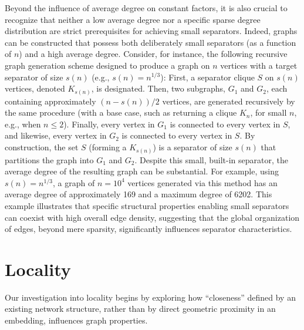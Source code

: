 Beyond the influence of average degree on constant factors, it is also crucial to recognize that neither a low average degree nor a specific sparse degree distribution are strict prerequisites for achieving small separators.
Indeed, graphs can be constructed that possess both deliberately small separators (as a function of \(n\)) and a high average degree.
Consider, for instance, the following recursive graph generation scheme designed to produce a graph on \(n\) vertices with a target separator of size \(s(n)\) (e.g., \(s(n) = n^{1/3}\)):
First, a separator clique \(S\) on \(s(n)\) vertices, denoted \(K_{s(n)}\), is designated.
Then, two subgraphs, \(G_1\) and \(G_2\), each containing approximately \((n-s(n))/2\) vertices, are generated recursively by the same procedure (with a base case, such as returning a clique \(K_n\), for small \(n\), e.g., when \(n \le 2\)).
Finally, every vertex in \(G_1\) is connected to every vertex in \(S\), and likewise, every vertex in \(G_2\) is connected to every vertex in \(S\).
By construction, the set \(S\) (forming a \(K_{s(n)}\)) is a separator of size \(s(n)\) that partitions the graph into \(G_1\) and \(G_2\).
Despite this small, built-in separator, the average degree of the resulting graph can be substantial.
For example, using \(s(n) = n^{1/3}\), a graph of \(n=10^4\) vertices generated via this method has an average degree of approximately 169 and a maximum degree of 6202.
This example illustrates that specific structural properties enabling small separators can coexist with high overall edge density, suggesting that the global organization of edges, beyond mere sparsity, significantly influences separator characteristics.

\section{Locality}
\label{sec:synthetic:locality}

Our investigation into locality begins by exploring how \enquote{closeness} defined by an existing network structure, rather than by direct geometric proximity in an embedding, influences graph properties.

